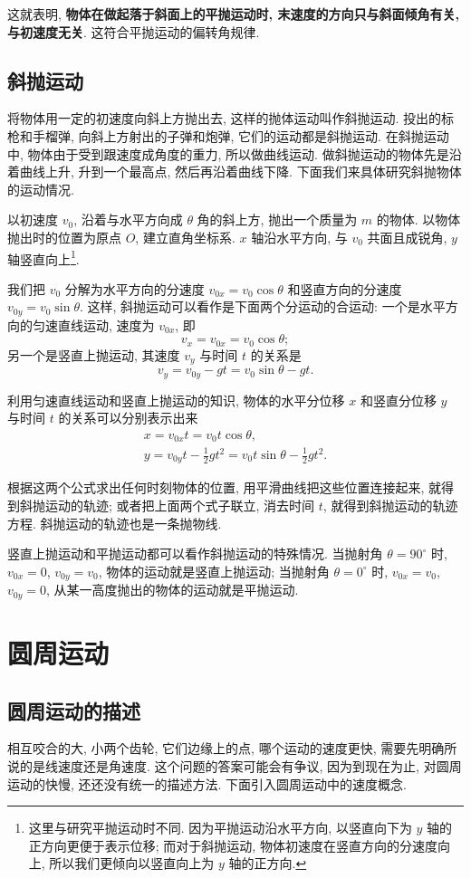 \documentclass[UTF8,openany,fontset=fandol]{ctexbook}
\theoremstyle{chinesetextbook}
\begin{document}
这就表明, \textbf{物体在做起落于斜面上的平抛运动时, 末速度的方向只与斜面倾角有关, 与初速度无关}. 这符合平抛运动的偏转角规律.
\section{斜抛运动}
将物体用一定的初速度向斜上方抛出去, 这样的抛体运动叫作斜抛运动. 投出的标枪和手榴弹, 向斜上方射出的子弹和炮弹, 它们的运动都是斜抛运动. 在斜抛运动中, 物体由于受到跟速度成角度的重力, 所以做曲线运动. 做斜抛运动的物体先是沿着曲线上升, 升到一个最高点, 然后再沿着曲线下降. 下面我们来具体研究斜抛物体的运动情况.

以初速度 $v_0$, 沿着与水平方向成 $\theta$ 角的斜上方, 抛出一个质量为 $m$ 的物体. 以物体抛出时的位置为原点 $O$, 建立直角坐标系. $x$ 轴沿水平方向, 与 $v_0$ 共面且成锐角, $y$ 轴竖直向上\footnote{这里与研究平抛运动时不同. 因为平抛运动沿水平方向, 以竖直向下为 $y$ 轴的正方向更便于表示位移; 而对于斜抛运动, 物体初速度在竖直方向的分速度向上, 所以我们更倾向以竖直向上为 $y$ 轴的正方向.}.

我们把 $v_0$ 分解为水平方向的分速度 $v_{0x}=v_0\cos\theta$ 和竖直方向的分速度 $v_{0y}=v_0\sin\theta.$ 这样, 斜抛运动可以看作是下面两个分运动的合运动: 一个是水平方向的匀速直线运动, 速度为 $v_{0x}$, 即
\[
v_x=v_{0x}=v_0\cos\theta;
\]
另一个是竖直上抛运动, 其速度 $v_y$ 与时间 $t$ 的关系是
\[
v_y=v_{0y}-gt=v_0\sin\theta-gt.
\]

利用匀速直线运动和竖直上抛运动的知识, 物体的水平分位移 $x$ 和竖直分位移 $y$ 与时间 $t$ 的关系可以分别表示出来
\[
\begin{gathered}
x=v_{0x}t=v_0t\cos\theta,\\
y=v_{0y}t-\frac12 gt^2=v_{0}t\sin\theta-\frac12 gt^2.
\end{gathered}
\]

根据这两个公式求出任何时刻物体的位置, 用平滑曲线把这些位置连接起来, 就得到斜抛运动的轨迹; 或者把上面两个式子联立, 消去时间 $t$, 就得到斜抛运动的轨迹方程. 斜抛运动的轨迹也是一条抛物线.

竖直上抛运动和平抛运动都可以看作斜抛运动的特殊情况. 当抛射角 $\theta=90^\circ$ 时, $v_{0x}=0$, $v_{0y}=v_0$, 物体的运动就是竖直上抛运动; 当抛射角 $\theta=0^\circ$ 时, $v_{0x}=v_0$, $v_{0y}=0$, 从某一高度抛出的物体的运动就是平抛运动.
\chapter{圆周运动}
\section{圆周运动的描述}
相互咬合的大, 小两个齿轮, 它们边缘上的点, 哪个运动的速度更快, 需要先明确所说的是线速度还是角速度. 这个问题的答案可能会有争议, 因为到现在为止, 对圆周运动的快慢, 还还没有统一的描述方法. 下面引入圆周运动中的速度概念.
\end{document}
